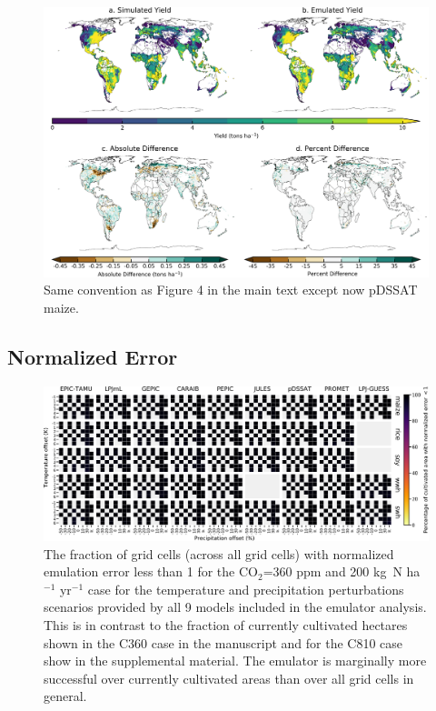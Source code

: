 \documentclass[10pt]{article}
\begin{document}
\begin{figure}[h!]
\includegraphics[width=\textwidth]{pdssat_maize.png}
\caption{Same convention as Figure 4 in the main text except now pDSSAT maize.}
\label{fig:lpjmlrice}
\end{figure}

\clearpage
\subsection{Normalized Error}

\begin{figure}[h!]
\centering
\includegraphics[width=15.5cm]{error_grid_360_all.png}
\caption{The fraction of grid cells (across all grid cells) with normalized emulation error less than 1 for the CO$_2$=360 ppm and 200 kg~N ha$^{-1}$ yr$^{-1}$ case for the temperature and precipitation perturbations scenarios provided by all 9 models included in the emulator analysis. This is in contrast to the fraction of currently cultivated hectares shown in the C360 case in the manuscript and for the C810 case show in the supplemental material. The emulator is marginally more successful over currently cultivated areas than over all grid cells in general.}
\label{fig:error810}
\end{figure}
\end{document}
